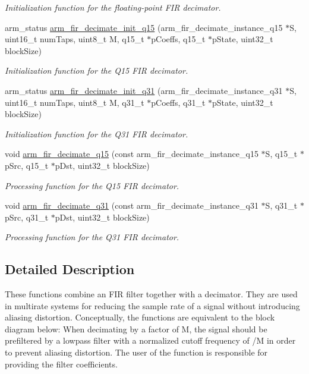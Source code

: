 \begin{DoxyCompactItemize}
\begin{DoxyCompactList}\small\item\em Initialization function for the floating-\/point F\+IR decimator. \end{DoxyCompactList}\item 
arm\+\_\+status \hyperlink{group__FIR__decimate_gada660e54b93d5d32178c6f5e1c6f368d}{arm\+\_\+fir\+\_\+decimate\+\_\+init\+\_\+q15} (arm\+\_\+fir\+\_\+decimate\+\_\+instance\+\_\+q15 $\ast$S, uint16\+\_\+t num\+Taps, uint8\+\_\+t M, q15\+\_\+t $\ast$p\+Coeffs, q15\+\_\+t $\ast$p\+State, uint32\+\_\+t block\+Size)
\begin{DoxyCompactList}\small\item\em Initialization function for the Q15 F\+IR decimator. \end{DoxyCompactList}\item 
arm\+\_\+status \hyperlink{group__FIR__decimate_ga9ed47c4e0f58affa935d84e0508a7f39}{arm\+\_\+fir\+\_\+decimate\+\_\+init\+\_\+q31} (arm\+\_\+fir\+\_\+decimate\+\_\+instance\+\_\+q31 $\ast$S, uint16\+\_\+t num\+Taps, uint8\+\_\+t M, q31\+\_\+t $\ast$p\+Coeffs, q31\+\_\+t $\ast$p\+State, uint32\+\_\+t block\+Size)
\begin{DoxyCompactList}\small\item\em Initialization function for the Q31 F\+IR decimator. \end{DoxyCompactList}\item 
void \hyperlink{group__FIR__decimate_gab8bef6d0f6a26fdbfce9485727713ce5}{arm\+\_\+fir\+\_\+decimate\+\_\+q15} (const arm\+\_\+fir\+\_\+decimate\+\_\+instance\+\_\+q15 $\ast$S, q15\+\_\+t $\ast$p\+Src, q15\+\_\+t $\ast$p\+Dst, uint32\+\_\+t block\+Size)
\begin{DoxyCompactList}\small\item\em Processing function for the Q15 F\+IR decimator. \end{DoxyCompactList}\item 
void \hyperlink{group__FIR__decimate_gaef8e86add28f15fdc5ecc484e9dd7a4e}{arm\+\_\+fir\+\_\+decimate\+\_\+q31} (const arm\+\_\+fir\+\_\+decimate\+\_\+instance\+\_\+q31 $\ast$S, q31\+\_\+t $\ast$p\+Src, q31\+\_\+t $\ast$p\+Dst, uint32\+\_\+t block\+Size)
\begin{DoxyCompactList}\small\item\em Processing function for the Q31 F\+IR decimator. \end{DoxyCompactList}\end{DoxyCompactItemize}


\subsection{Detailed Description}
These functions combine an F\+IR filter together with a decimator. They are used in multirate systems for reducing the sample rate of a signal without introducing aliasing distortion. Conceptually, the functions are equivalent to the block diagram below\+:  When decimating by a factor of {\ttfamily M}, the signal should be prefiltered by a lowpass filter with a normalized cutoff frequency of {/M} in order to prevent aliasing distortion. The user of the function is responsible for providing the filter coefficients.


